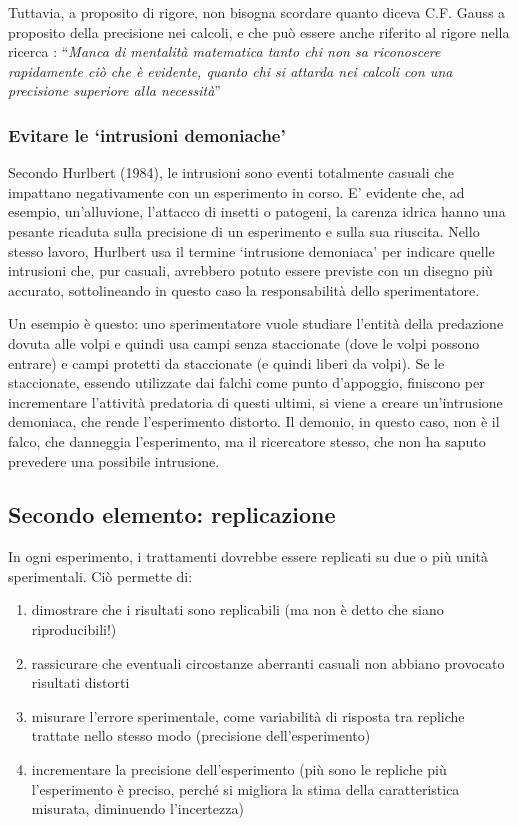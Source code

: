\documentclass[a4paper,12pt,oneside]{book}
\providecommand{\tightlist}{%
  \setlength{\itemsep}{0pt}\setlength{\parskip}{0pt}}
\theoremstyle{definition}
\theoremstyle{definition}
\theoremstyle{definition}
\theoremstyle{remark}
\begin{document}
Tuttavia, a proposito di rigore, non bisogna scordare quanto diceva C.F.
Gauss a proposito della precisione nei calcoli, e che può essere anche
riferito al rigore nella ricerca : ``\emph{Manca di mentalità matematica
tanto chi non sa riconoscere rapidamente ciò che è evidente, quanto chi
si attarda nei calcoli con una precisione superiore alla necessità}''

\subsubsection{\texorpdfstring{Evitare le `intrusioni
demoniache'}{Evitare le intrusioni demoniache}}\label{evitare-le-intrusioni-demoniache}

Secondo Hurlbert (1984), le intrusioni sono eventi totalmente casuali
che impattano negativamente con un esperimento in corso. E' evidente
che, ad esempio, un'alluvione, l'attacco di insetti o patogeni, la
carenza idrica hanno una pesante ricaduta sulla precisione di un
esperimento e sulla sua riuscita. Nello stesso lavoro, Hurlbert usa il
termine `intrusione demoniaca' per indicare quelle intrusioni che, pur
casuali, avrebbero potuto essere previste con un disegno più accurato,
sottolineando in questo caso la responsabilità dello sperimentatore.

Un esempio è questo: uno sperimentatore vuole studiare l'entità della
predazione dovuta alle volpi e quindi usa campi senza staccionate (dove
le volpi possono entrare) e campi protetti da staccionate (e quindi
liberi da volpi). Se le staccionate, essendo utilizzate dai falchi come
punto d'appoggio, finiscono per incrementare l'attività predatoria di
questi ultimi, si viene a creare un'intrusione demoniaca, che rende
l'esperimento distorto. Il demonio, in questo caso, non è il falco, che
danneggia l'esperimento, ma il ricercatore stesso, che non ha saputo
prevedere una possibile intrusione.

\subsection{Secondo elemento:
replicazione}\label{secondo-elemento-replicazione}

In ogni esperimento, i trattamenti dovrebbe essere replicati su due o
più unità sperimentali. Ciò permette di:

\begin{enumerate}
\def\labelenumi{\arabic{enumi}.}
\tightlist
\item
  dimostrare che i risultati sono replicabili (ma non è detto che siano
  riproducibili!)
\item
  rassicurare che eventuali circostanze aberranti casuali non abbiano
  provocato risultati distorti
\item
  misurare l'errore sperimentale, come variabilità di risposta tra
  repliche trattate nello stesso modo (precisione dell'esperimento)
\item
  incrementare la precisione dell'esperimento (più sono le repliche più
  l'esperimento è preciso, perché si migliora la stima della
  caratteristica misurata, diminuendo l'incertezza)
\end{enumerate}
\end{document}
